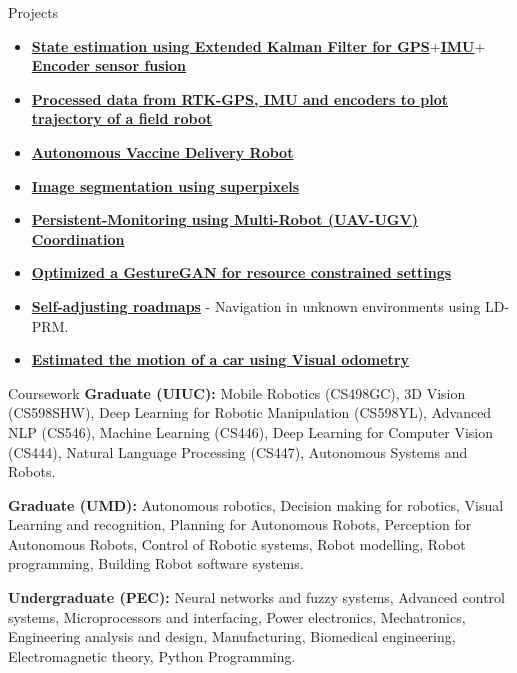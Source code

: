\documentclass{resume} %
\begin{document}
\begin{rSection}{Projects}
\begin{itemize}[noitemsep]
        \item {\bf \href{https://github.com/kulbir-ahluwalia/Extended_Kalman_Filter_for_GPS_INS_sensor_fusion}{State estimation using Extended Kalman Filter for GPS$+$IMU$+$Encoder sensor fusion}} 
        \item {\bf \href{https://github.com/kulbir-ahluwalia/RTKGPS_IMU_Encoders_Plot_trajectory_using_ROS}{Processed data from RTK-GPS, IMU and encoders to plot trajectory of a field robot}} 
        \item {\bf \href{https://github.com/kulbir-ahluwalia/Autonomous_Vaccine_Delivery_Robot}{Autonomous Vaccine Delivery Robot}} 
        \item {\bf \href{https://github.com/kulbir-ahluwalia/image-segmentation-using-superpixels}{Image segmentation using superpixels}}  
        \item {\bf \href{https://github.com/kulbir-ahluwalia/Persistent-Monitoring-using-Multi-Robot-UAV-UGV-Coordination}{Persistent-Monitoring using Multi-Robot (UAV-UGV) Coordination}} 
        \item {\bf \href{https://github.com/kulbir-ahluwalia/Optimized-GestureGAN-for-resource-constrained-settings}{Optimized a GestureGAN for resource constrained settings}} 
        \item {\bf \href{https://github.com/kulbir-ahluwalia/self-adjusting-roadmaps}{Self-adjusting roadmaps}} - Navigation in unknown environments using LD-PRM.  
        \item {\bf \href{https://github.com/kulbir-ahluwalia/Visual_Odometry_ENPM673_Perception}{Estimated the motion of a car using Visual odometry}} 
    \end{itemize}
\end{rSection}


\begin{rSection}{Coursework}
    \textbf{Graduate (UIUC): } Mobile Robotics (CS498GC), 3D Vision (CS598SHW), Deep Learning for Robotic Manipulation (CS598YL), Advanced NLP (CS546), Machine Learning (CS446), Deep Learning for Computer Vision (CS444), Natural Language Processing (CS447), Autonomous Systems and Robots.
    
    \textbf{Graduate (UMD): }Autonomous robotics, Decision making for robotics, Visual Learning and recognition, Planning for Autonomous Robots, Perception for Autonomous Robots, Control of Robotic systems, Robot modelling, Robot programming, Building Robot software systems.
    
    \textbf{Undergraduate (PEC): }Neural networks and fuzzy systems, Advanced control systems, Microprocessors and interfacing, Power electronics, Mechatronics, Engineering analysis and design, Manufacturing, Biomedical engineering, Electromagnetic theory, Python Programming.
\end{rSection}
\end{document}
